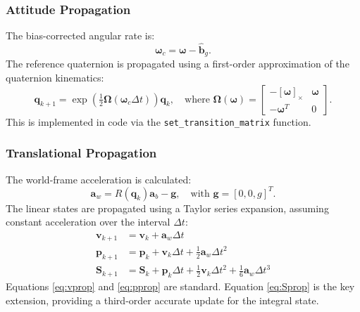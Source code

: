\documentclass[11pt,letterpaper]{article}
\begin{document}
\subsubsection{Attitude Propagation}
The bias-corrected angular rate is:
\[
\bm{\omega}_c = \bm{\omega} - \hat{\bm{b}}_g.
\]
The reference quaternion is propagated using a first-order approximation of the quaternion kinematics:
\begin{equation}
\bm{q}_{k+1} = \exp\!\left( \tfrac{1}{2} \bm{\Omega}(\bm{\omega}_c \Delta t) \right) \bm{q}_k, \quad \text{where } \bm{\Omega}(\bm{\omega}) = \begin{bmatrix}
-[\bm{\omega}]_\times & \bm{\omega} \\
-\bm{\omega}^T & 0
\end{bmatrix}.
\end{equation}
This is implemented in code via the \texttt{set\_transition\_matrix} function.

\subsubsection{Translational Propagation}
The world-frame acceleration is calculated:
\begin{equation}
\bm{a}_w = R(\bm{q}_k) \bm{a}_b - \bm{g}, \quad \text{with } \bm{g} = [0, 0, g]^T.
\end{equation}
The linear states are propagated using a Taylor series expansion, assuming constant acceleration over the interval $\Delta t$:
\begin{align}
\bm{v}_{k+1} &= \bm{v}_k + \bm{a}_w \Delta t \label{eq:vprop} \\
\bm{p}_{k+1} &= \bm{p}_k + \bm{v}_k \Delta t + \tfrac{1}{2}\bm{a}_w \Delta t^2 \label{eq:pprop} \\
\bm{S}_{k+1} &= \bm{S}_k + \bm{p}_k \Delta t + \tfrac{1}{2}\bm{v}_k \Delta t^2 + \tfrac{1}{6}\bm{a}_w \Delta t^3 \label{eq:Sprop}
\end{align}
Equations \ref{eq:vprop} and \ref{eq:pprop} are standard. Equation \ref{eq:Sprop} is the key extension, providing a third-order accurate update for the integral state.
\end{document}
